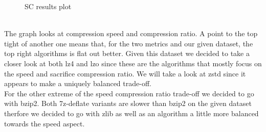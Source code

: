 \documentclass[
	12pt,
	a4paper,
	BCOR10mm,
	DIV14,
	listof=totoc,
	bibliography=totoc,
	headsepline
]{scrreprt}
\begin{document}
\begin{figure}[h]
\begin{center}
	\scalebox{0.75}{}
\end{center}
\caption{SC results plot}
\label{fig:sc_res}
\end{figure}

\FloatBarrier

\quad \\
The graph looks at compression speed and compression ratio. A point to the top tight of another one means that, for the two metrics and our given dataset, the top right algorithms is flat out better. Given this dataset we decided to take a closer look at both lz4 and lzo since these are the algorithms that mostly focus on the speed and sacrifice compression ratio. We will take a look at zstd since it appears to make a uniquely balanced trade-off. \\
For the other extreme of the speed compression ratio trade-off we decided to go with bzip2. Both 7z-deflate variants are slower than bzip2 on the given dataset therfore we decided to go with zlib as well as an algorithm a little more balanced towards the speed aspect.

\begin{table}
\begin{center}
\caption{SC results table, bold algorithms to be tested further}
\label{tab:sc_res}
\end{center}
\end{table}
\end{document}
